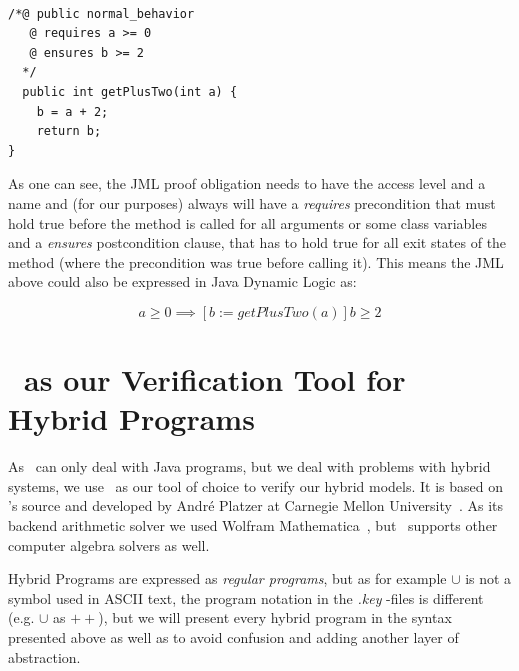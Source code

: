 \begin{lstlisting}[label=lst:jml_example]

/*@ public normal_behavior
   @ requires a >= 0
   @ ensures b >= 2
  */
  public int getPlusTwo(int a) {
  	b = a + 2;
  	return b;
}

\end{lstlisting}

As one can see, the JML proof obligation needs to have the access level and a name and (for our purposes) always will have a \textit{requires} precondition that must hold true before the method is called for all arguments or some class variables and a \textit{ensures} postcondition clause, that has to hold true for all exit states of the method (where the precondition was true before calling it). This means the JML above could also be expressed in Java Dynamic Logic as:

\begin{equation}
	a \geq 0 \implies [b := getPlusTwo(a) ] b \geq 2
	\label{eq:jmlddl}
\end{equation}

\section{\keym~as our Verification Tool for Hybrid Programs}
\label{sec:pre:key}

As \key~can only deal with Java programs, but we deal with problems with hybrid systems, we use \keym~as our tool of choice to verify our hybrid models. It is based on \key's source and developed by Andr\'e Platzer at Carnegie Mellon University~\cite{keymaera}. As its backend arithmetic solver we used Wolfram Mathematica~\cite{mathematica}, but \keym~supports other computer algebra solvers as well.

Hybrid Programs are expressed as \textit{regular programs}, but as for example \(\cup\) is not a symbol used in ASCII text, the program notation in the \textit{.key} \keym-files is different (e.g. \(\cup\) as \(++\)), but we will present every hybrid program in the syntax presented above as well as to avoid confusion and adding another layer of abstraction.
